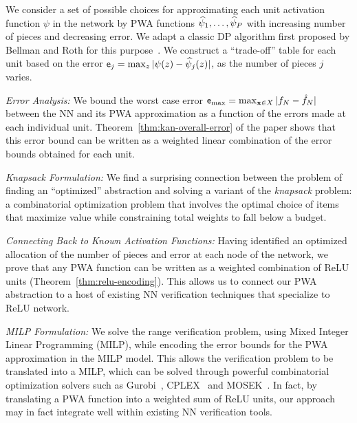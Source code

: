 \begin{compactenum}
\item We consider a set of possible choices for approximating each unit activation function $\psi$ in the network by  PWA functions $\widehat{\psi}_1, \ldots, \widehat{\psi}_P$ with increasing number of pieces and decreasing error. We adapt a classic DP algorithm first proposed by Bellman and Roth for this purpose~\cite{Bellman+Roth/1969/Curve,Bellman/1961/Approximation}. We construct a ``trade-off'' table for each unit based on the error $\mathsf{e}_j = \max_{z} | \psi(z) - \widehat{\psi}_j(z)|$, as the number of pieces $j$  varies.
\item \emph{Error Analysis:} We bound the worst case error $\mathsf{e}_{\max} = \max_{ \mathbf{x} \in X} |f_N - \hat{f}_N|$ between the NN and its PWA approximation as a function of the errors made at each individual unit. Theorem~\ref{thm:kan-overall-error} of the paper shows that this error bound can be written as a weighted linear combination of the error bounds obtained for each unit. 
\item \emph{Knapsack Formulation:}  We find a surprising connection between the problem of finding an ``optimized'' abstraction and solving a variant of the \emph{knapsack} problem: a combinatorial optimization problem that involves the optimal choice of items that maximize value while constraining total weights to fall below a budget. 
\item \emph{Connecting Back to Known Activation Functions:} Having identified an optimized allocation of the number of pieces and error at each node of the network, we prove that any PWA function can be written as a weighted combination of ReLU units (Theorem~\ref{thm:relu-encoding}). This allows us to connect our PWA abstraction to a host of existing NN verification techniques that specialize to ReLU network. 
\item \emph{MILP Formulation:} We solve the range verification problem, using  Mixed Integer Linear Programming (MILP), while encoding the error bounds for the PWA approximation  in the MILP model. This allows the verification problem to be translated into a MILP, which can be solved through powerful combinatorial optimization solvers such as Gurobi~\cite{gurobi}, CPLEX~\cite{cplex} and MOSEK~\cite{mosek}. In fact, by translating a PWA function into a weighted sum of ReLU units, our approach may in fact integrate well within existing NN verification tools.


\end{compactenum}

